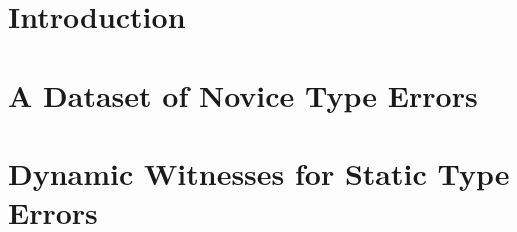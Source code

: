 \documentclass[12pt]{ucsddissertation}
\theoremstyle{plain}%
\theoremstyle{definition}
\begin{document}
\mainmatter



\lstMakeShortInline{|}

\chapter{Introduction}
\label{chp:intro}


\chapter{A Dataset of Novice Type Errors}
\label{chp:data-collection}


\chapter{Dynamic Witnesses for Static Type Errors}
\label{chp:nanomaly}
\newcommand\toolname{\tool{NanoMaLy}}







%
%
%
%
%
%
%
\end{document}
